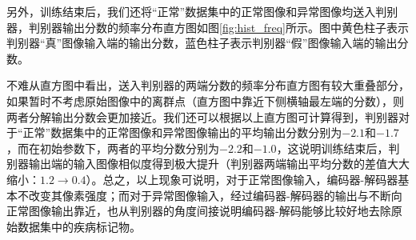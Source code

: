 另外，训练结束后，我们还将“正常”数据集中的正常图像和异常图像均送入判别器，判别器输出分数的频率分布直方图如图\ref{fig:hist_freq}所示。图中黄色柱子表示判别器“真”图像输入端的输出分数，蓝色柱子表示判别器“假”图像输入端的输出分数。

不难从直方图中看出，送入判别器的两端分数的频率分布直方图有较大重叠部分，如果暂时不考虑原始图像中的离群点（直方图中靠近下侧横轴最左端的分数），则两者分解输出分数会更加接近。我们还可以根据以上直方图可计算得到，判别器对于“正常”数据集中的正常图像和异常图像输出的平均输出分数分别为$-2.1$和$-1.7$，而在初始参数下，两者的平均分数分别为$-2.2$和$-1.0$，这说明训练结束后，判别器输出端的输入图像相似度得到极大提升（判别器两端输出平均分数的差值大大缩小：$1.2\rightarrow 0.4$）。总之，以上现象可说明，对于正常图像输入，编码器-解码器基本不改变其像素强度；而对于异常图像输入，经过编码器-解码器的输出与不断向正常图像输出靠近，也从判别器的角度间接说明编码器-解码能够比较好地去除原始数据集中的疾病标记物。



